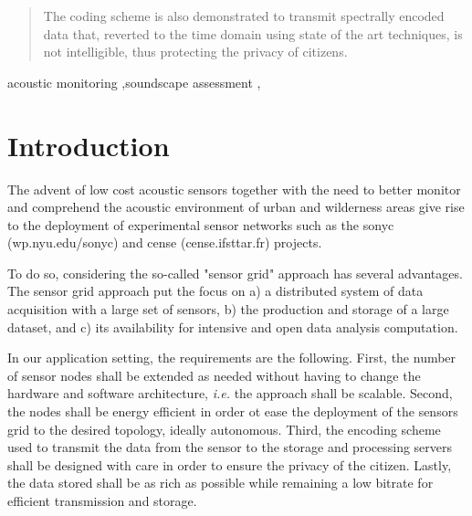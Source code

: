 \documentclass[final,3p,times,twocolumn]{elsarticle}
\begin{document}
\begin{frontmatter}
\begin{abstract}
The coding scheme is also demonstrated to transmit spectrally encoded data that, reverted to the time domain using state of the art techniques, is not intelligible, thus protecting the privacy of citizens.

\end{abstract}

\begin{keyword}

acoustic monitoring \sep soundscape assessment \sep



\end{keyword}

\end{frontmatter}

\clearpage
\section{Introduction}

The advent of low cost acoustic sensors together with the need to better monitor and comprehend the acoustic environment of urban and wilderness areas give rise to the deployment of experimental sensor networks such as the sonyc (wp.nyu.edu/sonyc) and cense (cense.ifsttar.fr) projects.

To do so, considering the so-called "sensor grid" approach  \cite{lim2005sensor,tham2005sensorgrid} has several advantages. The sensor grid approach put the focus on a) a distributed system of data acquisition with a large set of sensors, b) the production and storage of a large dataset, and c) its availability for intensive and open data analysis computation.

In our application setting, the requirements are the following. First,  the number of sensor nodes shall be extended as needed without having to change the hardware and software architecture, \textit{i.e.} the approach shall be scalable. Second, the nodes shall be energy efficient in order ot ease the deployment of the sensors grid to the desired topology, ideally autonomous. Third, the encoding scheme used to transmit the data from the sensor to the storage and processing servers shall be designed with care in order to ensure the privacy of the citizen. Lastly, the data stored shall be as rich as possible while remaining a low bitrate for efficient transmission and storage.
\end{document}
